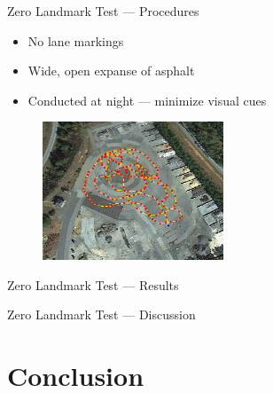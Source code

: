 \documentclass{beamer}
\begin{document}
    \begin{frame}{Zero Landmark Test --- Procedures}
      \begin{itemize}
        \item No lane markings
        \item Wide, open expanse of asphalt
        \item Conducted at night --- minimize visual cues
      \end{itemize}

      \begin{figure}
        \centering
        \includegraphics[width=0.48\textwidth]{../graphics/zero_landmark_path.png}
      \end{figure}
      
    \end{frame}

    \begin{frame}{Zero Landmark Test --- Results}
    \end{frame}

    \begin{frame}{Zero Landmark Test --- Discussion}
    \end{frame}



\section{Conclusion}

  \begin{frame}
  \end{frame}
\end{document}
